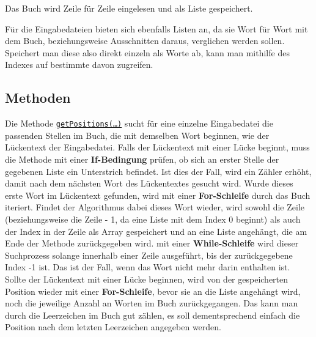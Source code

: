 \documentclass[a4paper, 10pt, ngerman]{scrartcl}
\begin{document}
Das Buch wird Zeile für Zeile eingelesen
und als Liste gespeichert.
		
Für die Eingabedateien bieten sich ebenfalls Listen an,
da sie Wort für Wort mit dem Buch,
beziehungsweise Ausschnitten daraus,
verglichen werden sollen.
Speichert man diese also direkt einzeln als Worte ab,
kann man mithilfe des Indexes auf bestimmte davon zugreifen.

\subsection{Methoden}
Die Methode \hyperref[sec:getPositions()]{\texttt{getPositions(\ldots)}} sucht für eine einzelne Eingabedatei die passenden Stellen im Buch,
die mit demselben Wort beginnen,
wie der Lückentext der Eingabedatei.
Falls der Lückentext mit einer Lücke beginnt,
muss die Methode mit einer \textbf{If-Bedingung} prüfen,
ob sich an erster Stelle der gegebenen Liste ein Unterstrich befindet.
Ist dies der Fall,
wird ein Zähler erhöht,
damit nach dem nächsten Wort des Lückentextes gesucht wird.
Wurde dieses erste Wort im Lückentext gefunden,
wird mit einer \textbf{For-Schleife} durch das Buch iteriert.
Findet der Algorithmus dabei dieses Wort wieder,
wird sowohl die Zeile
(beziehungsweise die Zeile - 1, da eine Liste mit dem Index 0 beginnt)
als auch der Index in der Zeile als Array gespeichert
und an eine Liste angehängt,
die am Ende der Methode zurückgegeben wird.
mit einer \textbf{While-Schleife} wird dieser Suchprozess solange innerhalb einer Zeile ausgeführt,
bis der zurückgegebene Index -1 ist.
Das ist der Fall,
wenn das Wort nicht mehr darin enthalten ist.
Sollte der Lückentext mit einer Lücke beginnen,
wird von der gespeicherten Position wieder mit einer \textbf{For-Schleife},
bevor sie an die Liste angehängt wird,
noch die jeweilige Anzahl an Worten im Buch zurückgegangen.
Das kann man durch die Leerzeichen im Buch gut zählen,
es soll dementsprechend einfach die Position nach dem letzten Leerzeichen angegeben werden.
\end{document}
